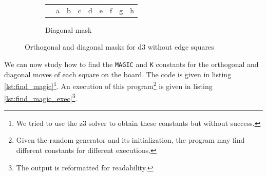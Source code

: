 \documentclass[12pt,a4paper,twoside,openright]{book}
\begin{document}
\begin{figure}[htpb]
\begin{subfigure}[b]{0.42\textwidth}
\begin{tabular}{|c|*{8}{>{\centering\arraybackslash}p{0.4cm}|}}
\multicolumn{1}{c|}{} & a & b & c & d & e & f & g & h \\
\cline{2-9}
\end{tabular}
\caption{Diagonal mask}
\label{fig:diagonal_mask_d3}
\end{subfigure}

\caption{Orthogonal and diagonal masks for d3 without edge squares}
\label{fig:diagonal_orthogonal_masks_d3}
\end{figure}

We can now study how to find the \texttt{MAGIC} and \texttt{K} constants for the orthogonal and diagonal moves of each square on the board. The code is given in listing \ref{lst:find_magic}\footnote{We tried to use the \gls{z3} solver to obtain these constants but without success.}. An execution of this program\footnote{Given the random generator and its initialization, the program may find different constants for different executions.} is given in listing \ref{lst:find_magic_exec}\footnote{The output is reformatted for readability.}.
\end{document}

